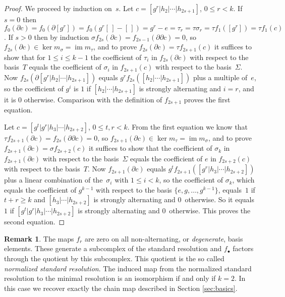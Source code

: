 \documentclass[11pt,a4paper,draft]{article}
\DeclareMathOperator\Bild{im}
\DeclareMathOperator\Kern{ker}
\newcommand\im{\Bild}
\renewcommand\ker{\Kern}
\newcommand{\dd}{\partial}
\theoremstyle{definition}
\newtheorem{remark}[theorem]{Remark}
\begin{document}
\begin{proof}
We proceed by induction on~$s$.  
Let $c=[g^r|h_2|\cdots|h_{2s+1}]$,
$0\le r<k$.  If $s=0$ then $f_0(\dd
c)=f_0(\dd[g^r])=f_0(g^r[\,]-[\,])=g^r-e=\tau_r=\tau\sigma_r=\tau
f_1([g^r])=\tau f_1(c)$.  If $s>0$ then by induction $\sigma
f_{2s}(\dd c)=f_{2s-1}(\dd\dd c)=0$, so $f_{2s}(\dd c)\in\ker
m_\sigma=\im m_\tau$, and to prove $f_{2s}(\dd c)=\tau f_{2s+1}(c)$
it suffices to show that for $1\le i\le k-1$ the coefficient of
$\tau_i$ in $f_{2s}(\dd c)$ with respect to the basis~$T$ equals the
coefficient of $\sigma_i$ in $f_{2s+1}(c)$ with respect to the 
basis~$\Sigma$.  Now $f_{2s}(\dd [g^r|h_2|\cdots|h_{2s+1}])$ equals $g^r
f_{2s}([h_2|\cdots|h_{2s+1}])$ plus a multiple of~$e$, so the
coefficient of $g^i$ is $1$ if $[h_2|\cdots|h_{2s+1}]$ is strongly alternating and
$i=r$, and it is $0$ otherwise.  Comparison with the definition of
$f_{2s+1}$ proves the first equation.

Let $c=[g^t|g^r|h_3|\cdots|h_{2s+2}]$, $0\le t,r<k$.  From the first
equation we know that $\tau f_{2s+1}(\dd c)=f_{2s}(\dd\dd c)=0$, so
$f_{2s+1}(\dd c)\in\ker m_\tau=\im m_\sigma$, and to prove
$f_{2s+1}(\dd c)=\sigma f_{2s+2}(c)$ it suffices to show that the
coefficient of $\sigma_{k}$ in $f_{2s+1}(\dd c)$ with respect to the
basis~$\Sigma$ equals the coefficient of $e$ in $f_{2s+2}(c)$ with
respect to the basis~$T$.  Now $f_{2s+1}(\dd c)$ equals $g^t
f_{2s+1}([g^r|h_3|\cdots|h_{2s+2}])$ plus a linear combination of
the~$\sigma_i$ with $1\le i<k$, so the
coefficient of $\sigma_k$, which equals the coefficient of $g^{k-1}$
with respect to the basis $\{e,g,\ldots, g^{k-1} \}$, equals~$1$ if
$t+r\ge k$ and $[h_3|\cdots|h_{2s+2}]$ is strongly alternating and $0$~otherwise.
So it equals~$1$ if
$[g^t|g^r|h_3|\cdots|h_{2s+2}]$ is strongly alternating and $0$~otherwise.  This proves
the second equation.
\end{proof}

\begin{remark} \label{rem:normalized}
The maps $f_r$ are zero on all non-alternating, or \emph{degenerate},
basis elements.  These generate a subcomplex
of the standard resolution and $f_\bullet$
factors through the quotient by this subcomplex. This quotient
is the so called \emph{normalized standard resolution}. The
induced map from the normalized standard resolution to
the minimal resolution is an isomorphism if and only if $k=2$.
In this case we recover exactly the chain map described
in Section \ref{sec:basics}.
 \end{remark}
\end{document}
